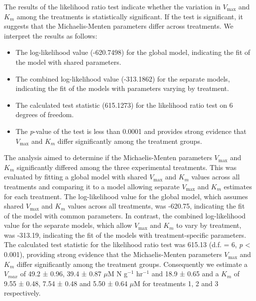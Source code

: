 \documentclass[
  letterpaper,
]{book}
\providecommand{\tightlist}{%
  \setlength{\itemsep}{0pt}\setlength{\parskip}{0pt}}\usepackage{longtable,booktabs,array}
\begin{document}
The results of the likelihood ratio test indicate whether the variation
in \(V_{\max}\) and \(K_m\) among the treatments is statistically
significant. If the test is significant, it suggests that the
Michaelis-Menten parameters differ across treatments. We interpret the
results as follows:

\begin{itemize}
\tightlist
\item
  The log-likelihood value (-620.7498) for the global model, indicating
  the fit of the model with shared parameters.
\item
  The combined log-likelihood value (-313.1862) for the separate models,
  indicating the fit of the models with parameters varying by treatment.
\item
  The calculated test statistic (615.1273) for the likelihood ratio test
  on 6 degrees of freedom.
\item
  The \emph{p}-value of the test is less than 0.0001 and provides strong
  evidence that \(V_{\max}\) and \(K_m\) differ significantly among the
  treatment groups.
\end{itemize}

\begin{tcolorbox}[enhanced jigsaw, opacitybacktitle=0.6, toptitle=1mm, colframe=quarto-callout-tip-color-frame, arc=.35mm, left=2mm, rightrule=.15mm, coltitle=black, opacityback=0, bottomrule=.15mm, bottomtitle=1mm, title=\textcolor{quarto-callout-tip-color}{\faLightbulb}\hspace{0.5em}{Results}, toprule=.15mm, colbacktitle=quarto-callout-tip-color!10!white, titlerule=0mm, leftrule=.75mm, colback=white, breakable]

The analysis aimed to determine if the Michaelis-Menten parameters
\(V_{\max}\) and \(K_m\) significantly differed among the three
experimental treatments. This was evaluated by fitting a global model
with shared \(V_{\max}\) and \(K_m\) values across all treatments and
comparing it to a model allowing separate \(V_{\max}\) and \(K_m\)
estimates for each treatment. The log-likelihood value for the global
model, which assumes shared \(V_{\max}\) and \(K_m\) values across all
treatments, was -620.75, indicating the fit of the model with common
parameters. In contrast, the combined log-likelihood value for the
separate models, which allow \(V_{\max}\) and \(K_m\) to vary by
treatment, was -313.19, indicating the fit of the models with
treatment-specific parameters. The calculated test statistic for the
likelihood ratio test was 615.13 (d.f. = 6, \emph{p} \textless{} 0.001),
providing strong evidence that the Michaelis-Menten parameters
\(V_{\max}\) and \(K_m\) differ significantly among the treatment
groups. Consequently we estimate a \(V_{max}\) of 49.2 ± 0.96, 39.4 ±
0.87 \(\mu\)M N g\(^{-1}\) hr\(^{-1}\) and 18.9 ± 0.65 and a \(K_m\) of
9.55 ± 0.48, 7.54 ± 0.48 and 5.50 ± 0.64 \(\mu\)M for treatments 1, 2
and 3 respectively.

\end{tcolorbox}
\end{document}
